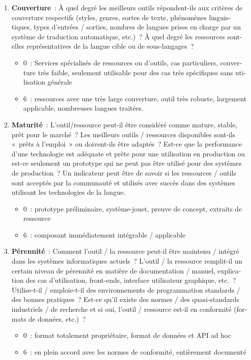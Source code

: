 \begin{french}
\begin{multicols}{2}
\begin{enumerate}
\item {\bf Couverture}~: À quel degré les meilleurs outils répondent-ils aux critères de couverture respectifs (styles, genres, sortes de texte, phénomènes linguistiques, types d'entrées / sorties, nombres de langues prises en charge par un système de traduction automatique, etc.)~? À quel degré les ressources sont-elles représentatives de la langue cible ou de sous-langages~? 
      \begin{itemize}
      \item 0~: Services spécialisés de ressources ou d'outils, cas particuliers, couverture très faible, seulement utilisable pour des cas très spécifiques sans utilisation générale
      \item 6~: ressources avec une très large couverture, outil très robuste, largement applicable, nombreuses langues traitées.
      \end{itemize}

\item {\bf Maturité}~: L'outil/ressource peut-il être considéré comme mature, stable, prêt pour le marché~? Les meilleurs outils / ressources disponibles sont-ils «~prêts à l'emploi~» ou doivent-ils être adaptés~? Est-ce que la performance d'une technologie est adéquate et prête pour une utilisation en production ou est-ce seulement un prototype qui ne peut pas être utilisé pour des systèmes de production~? Un indicateur peut être de savoir si les ressources / outils sont acceptés par la communauté et utilisés avec succès dans des systèmes utilisant les technologies de la langue.  
     \begin{itemize}
      \item 0~: prototype préliminaire, système-jouet, preuve de concept, extraits de ressource
      \item 6~: composant immédiatement intégrable / applicable
      \end{itemize}

\item {\bf Pérennité}~: Comment l'outil / la ressource peut-il être maintenu / intégré dans les systèmes informatiques actuels~? L'outil / la ressource remplit-il un certain niveau de pérennité en matière de documentation / manuel, explication des cas d'utilisation, front-ends, interface utilisateur graphique, etc.~? Utilise-t-il / emploie-t-il des environnements de programmation standards / des bonnes pratiques~? Est-ce qu'il existe des normes / des quasi-standards industriels / de recherche et si oui, l'outil / ressource est-il en conformité (formats de données, etc.)~? 
      \begin{itemize}
      \item 0~: format totalement propriétaire, format de données et API ad hoc
      \item 6~: en plein accord avec les normes de conformité, entièrement documenté
      \end{itemize}


\end{enumerate}
\end{multicols}
\end{french}
